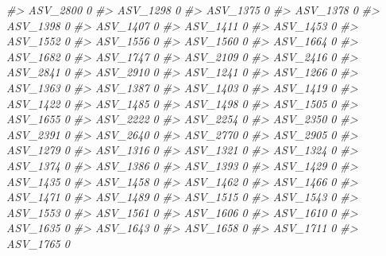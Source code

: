\documentclass[
]{article}
\newenvironment{Shaded}{\begin{snugshade}}{\end{snugshade}}
\newcommand{\CommentTok}[1]{\textcolor[rgb]{0.56,0.35,0.01}{\textit{#1}}}
\begin{document}
\begin{Shaded}
\begin{Highlighting}[]
\CommentTok{\#\textgreater{} ASV\_2800  0}
\CommentTok{\#\textgreater{} ASV\_1298  0}
\CommentTok{\#\textgreater{} ASV\_1375  0}
\CommentTok{\#\textgreater{} ASV\_1378  0}
\CommentTok{\#\textgreater{} ASV\_1398  0}
\CommentTok{\#\textgreater{} ASV\_1407  0}
\CommentTok{\#\textgreater{} ASV\_1411  0}
\CommentTok{\#\textgreater{} ASV\_1453  0}
\CommentTok{\#\textgreater{} ASV\_1552  0}
\CommentTok{\#\textgreater{} ASV\_1556  0}
\CommentTok{\#\textgreater{} ASV\_1560  0}
\CommentTok{\#\textgreater{} ASV\_1664  0}
\CommentTok{\#\textgreater{} ASV\_1682  0}
\CommentTok{\#\textgreater{} ASV\_1747  0}
\CommentTok{\#\textgreater{} ASV\_2109  0}
\CommentTok{\#\textgreater{} ASV\_2416  0}
\CommentTok{\#\textgreater{} ASV\_2841  0}
\CommentTok{\#\textgreater{} ASV\_2910  0}
\CommentTok{\#\textgreater{} ASV\_1241  0}
\CommentTok{\#\textgreater{} ASV\_1266  0}
\CommentTok{\#\textgreater{} ASV\_1363  0}
\CommentTok{\#\textgreater{} ASV\_1387  0}
\CommentTok{\#\textgreater{} ASV\_1403  0}
\CommentTok{\#\textgreater{} ASV\_1419  0}
\CommentTok{\#\textgreater{} ASV\_1422  0}
\CommentTok{\#\textgreater{} ASV\_1485  0}
\CommentTok{\#\textgreater{} ASV\_1498  0}
\CommentTok{\#\textgreater{} ASV\_1505  0}
\CommentTok{\#\textgreater{} ASV\_1655  0}
\CommentTok{\#\textgreater{} ASV\_2222  0}
\CommentTok{\#\textgreater{} ASV\_2254  0}
\CommentTok{\#\textgreater{} ASV\_2350  0}
\CommentTok{\#\textgreater{} ASV\_2391  0}
\CommentTok{\#\textgreater{} ASV\_2640  0}
\CommentTok{\#\textgreater{} ASV\_2770  0}
\CommentTok{\#\textgreater{} ASV\_2905  0}
\CommentTok{\#\textgreater{} ASV\_1279  0}
\CommentTok{\#\textgreater{} ASV\_1316  0}
\CommentTok{\#\textgreater{} ASV\_1321  0}
\CommentTok{\#\textgreater{} ASV\_1324  0}
\CommentTok{\#\textgreater{} ASV\_1374  0}
\CommentTok{\#\textgreater{} ASV\_1386  0}
\CommentTok{\#\textgreater{} ASV\_1393  0}
\CommentTok{\#\textgreater{} ASV\_1429  0}
\CommentTok{\#\textgreater{} ASV\_1435  0}
\CommentTok{\#\textgreater{} ASV\_1458  0}
\CommentTok{\#\textgreater{} ASV\_1462  0}
\CommentTok{\#\textgreater{} ASV\_1466  0}
\CommentTok{\#\textgreater{} ASV\_1471  0}
\CommentTok{\#\textgreater{} ASV\_1489  0}
\CommentTok{\#\textgreater{} ASV\_1515  0}
\CommentTok{\#\textgreater{} ASV\_1543  0}
\CommentTok{\#\textgreater{} ASV\_1553  0}
\CommentTok{\#\textgreater{} ASV\_1561  0}
\CommentTok{\#\textgreater{} ASV\_1606  0}
\CommentTok{\#\textgreater{} ASV\_1610  0}
\CommentTok{\#\textgreater{} ASV\_1635  0}
\CommentTok{\#\textgreater{} ASV\_1643  0}
\CommentTok{\#\textgreater{} ASV\_1658  0}
\CommentTok{\#\textgreater{} ASV\_1711  0}
\CommentTok{\#\textgreater{} ASV\_1765  0}

\end{Highlighting}
\end{Shaded}
\end{document}
